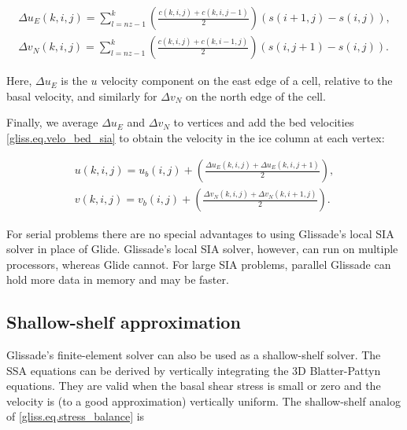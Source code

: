 {\begin{equation}
  \label{gliss.eq.velo_interior_sia}
  \begin{split}
    {\Delta {u}_{E}}(k,i,j) = \sum\limits_{l=nz-1}^{k}{\left( \frac{c(k,i,j)+c(k,i,j-1)}{2} \right)\left( s(i+1,j)-s(i,j) \right)}, \\
    {\Delta {v}_{N}}(k,i,j) = \sum\limits_{l=nz-1}^{k}{\left( \frac{c(k,i,j)+c(k,i-1,j)}{2} \right)\left( s(i,j+1)-s(i,j) \right)}.
  \end{split}
\end{equation}

\noindent
Here, $\Delta{u_E}$ is the $u$ velocity component on the east edge of a cell, relative to the basal velocity,
and similarly for $\Delta{v_N}$ on the north edge of the cell.

Finally, we average $\Delta u_E$ and $\Delta v_N$ to vertices and add the bed velocities 
\eqref{gliss.eq.velo_bed_sia} to obtain the velocity in the ice column at each vertex:

\begin{equation}
  \label{gliss.eq.velo_sia}
  \begin{split}
    u(k,i,j) = u_b(i,j) + \left( \frac{\Delta {{u}_{E}}(k,i,j) + \Delta {{u}_{E}}(k,i,j+1)}{2} \right), \\
    v(k,i,j) = v_b(i,j) + \left( \frac{\Delta {{v}_{N}}(k,i,j) + \Delta {{v}_{N}}(k,i+1,j)}{2} \right).
  \end{split}
\end{equation}

For serial problems there are no special advantages to using Glissade's local SIA solver 
in place of Glide.  Glissade's local SIA solver, however, can run on multiple processors, 
whereas Glide cannot.  For large SIA problems, parallel Glissade can hold more data
in memory and may be faster.

\subsection{Shallow-shelf approximation}

Glissade's finite-element solver can also be used as a shallow-shelf solver.  The SSA equations 
can be derived by vertically integrating the 3D Blatter-Pattyn equations.
They are valid when the basal shear stress is small or zero and the velocity is 
(to a good approximation) vertically uniform.  The shallow-shelf analog of \eqref{gliss.eq.stress_balance} is

}

